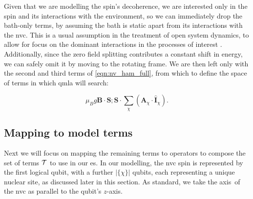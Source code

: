 
Given that we are modelling the spin's decoherence, 
    we are interested only in the spin and its interactions with the environment, 
    so we can immediately drop the bath-only terms, 
    by assuming the bath is static apart from its interactions with the \gls{nvc}. 
This is a usual assumption in the treatment of open system dynamics, 
    to allow for focus on the dominant interactions in the processes of interest \cite{breuer2002theory}. 
Additionally, since the zero field splitting contributes a constant shift in energy, 
    we can safely omit it by moving to the rotating frame. 
We are then left only with the second and third terms of \cref{eqn:nv_ham_full}, 
    from which to define the space of terms in which \gls{qmla} will search:

\begin{subequations}
    \begin{equation}
        \label{eqn:nv_spin_terms}
        \mu_B g \mathbf{B} \cdot \mathbf{S};
    \end{equation}
    \begin{equation}
        \label{eqn:nv_hyperfine_terms}
        \mathbf{S} \cdot \sum_{\chi} \left( \mathbf{A}_{\chi} \cdot \mathbf{\hat{I}}_{\chi} \right).
    \end{equation}
\end{subequations}

\subsection{Mapping to model terms}
Next we will focus on mapping the remaining terms to operators to compose the set of terms 
    $\mathcal{T}$ to use in our \gls{es}. 
In our modelling, the \gls{nvc} spin is represented by the first logical qubit, 
    with a further $|\{\chi\}|$ qubits, each representing a unique nuclear site, 
    as discussed later in this section. 
As standard, we take the axis\footnotemark \ of the \gls{nvc} as parallel to the qubit's $z$-axis. 

\par 

